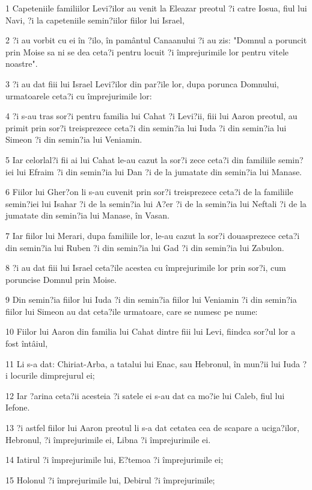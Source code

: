 \par 1 Capeteniile familiilor Levi?ilor au venit la Eleazar preotul ?i catre Iosua, fiul lui Navi, ?i la capeteniile semin?iilor fiilor lui Israel,
\par 2 ?i au vorbit cu ei în ?ilo, în pamântul Canaanului ?i au zis: "Domnul a poruncit prin Moise sa ni se dea ceta?i pentru locuit ?i împrejurimile lor pentru vitele noastre".
\par 3 ?i au dat fiii lui Israel Levi?ilor din par?ile lor, dupa porunca Domnului, urmatoarele ceta?i cu împrejurimile lor:
\par 4 ?i s-au tras sor?i pentru familia lui Cahat ?i Levi?ii, fiii lui Aaron preotul, au primit prin sor?i treisprezece ceta?i din semin?ia lui Iuda ?i din semin?ia lui Simeon ?i din semin?ia lui Veniamin.
\par 5 Iar celorlal?i fii ai lui Cahat le-au cazut la sor?i zece ceta?i din familiile semin?iei lui Efraim ?i din semin?ia lui Dan ?i de la jumatate din semin?ia lui Manase.
\par 6 Fiilor lui Gher?on li s-au cuvenit prin sor?i treisprezece ceta?i de la familiile semin?iei lui Isahar ?i de la semin?ia lui A?er ?i de la semin?ia lui Neftali ?i de la jumatate din semin?ia lui Manase, în Vasan.
\par 7 Iar fiilor lui Merari, dupa familiile lor, le-au cazut la sor?i douasprezece ceta?i din semin?ia lui Ruben ?i din semin?ia lui Gad ?i din semin?ia lui Zabulon.
\par 8 ?i au dat fiii lui Israel ceta?ile acestea cu împrejurimile lor prin sor?i, cum poruncise Domnul prin Moise.
\par 9 Din semin?ia fiilor lui Iuda ?i din semin?ia fiilor lui Veniamin ?i din semin?ia fiilor lui Simeon au dat ceta?ile urmatoare, care se numesc pe nume:
\par 10 Fiilor lui Aaron din familia lui Cahat dintre fiii lui Levi, fiindca sor?ul lor a fost întâiul,
\par 11 Li s-a dat: Chiriat-Arba, a tatalui lui Enac, sau Hebronul, în mun?ii lui Iuda ?i locurile dimprejurul ei;
\par 12 Iar ?arina ceta?ii acesteia ?i satele ei s-au dat ca mo?ie lui Caleb, fiul lui Iefone.
\par 13 ?i astfel fiilor lui Aaron preotul li s-a dat cetatea cea de scapare a uciga?ilor, Hebronul, ?i împrejurimile ei, Libna ?i împrejurimile ei.
\par 14 Iatirul ?i împrejurimile lui, E?temoa ?i împrejurimile ei;
\par 15 Holonul ?i împrejurimile lui, Debirul ?i împrejurimile;
